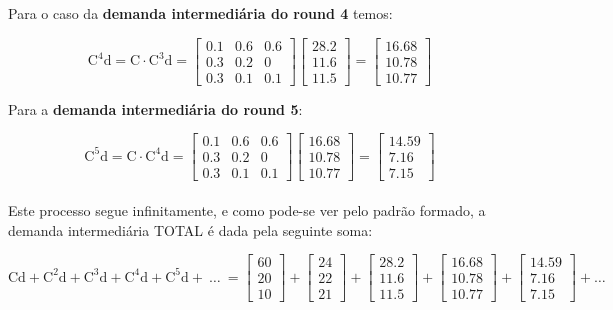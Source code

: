 \documentclass[a4paper, 12pt]{article}
\begin{document}
Para o caso da \textbf{demanda intermediária do round 4} temos:

$$\mathrm{C^4d}=\mathrm{C\cdot C^3d}=\begin{bmatrix}
0.1&0.6&0.6\\
0.3&0.2&0\\
0.3&0.1&0.1
\end{bmatrix}\begin{bmatrix}
28.2\\
11.6\\
11.5
\end{bmatrix}=\begin{bmatrix}
16.68\\
10.78\\
10.77
\end{bmatrix}$$

Para a \textbf{demanda intermediária do round 5}:

$$\mathrm{C^5d}=\mathrm{C\cdot C^4d}=\begin{bmatrix}
0.1&0.6&0.6\\
0.3&0.2&0\\
0.3&0.1&0.1
\end{bmatrix}\begin{bmatrix}
16.68\\
10.78\\
10.77
\end{bmatrix}=\begin{bmatrix}
14.59\\
7.16\\
7.15
\end{bmatrix}$$\\



Este processo segue infinitamente, e como pode-se ver pelo padrão formado, a demanda intermediária TOTAL é dada pela seguinte soma:

$$\mathrm{Cd}+\mathrm{C^2d}+\mathrm{C^3d}+\mathrm{C^4d}+\mathrm{C^5d}+\ \dots \ =\begin{bmatrix}
60\\
20\\
10
\end{bmatrix}+\begin{bmatrix}
24\\
22\\
21
\end{bmatrix}+\begin{bmatrix}
28.2\\
11.6\\
11.5
\end{bmatrix}+\begin{bmatrix}
16.68\\
10.78\\
10.77
\end{bmatrix}+\begin{bmatrix}
14.59\\
7.16\\
7.15
\end{bmatrix}+\dots $$
\end{document}
